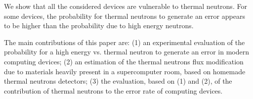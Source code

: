 We show that all the considered devices are vulnerable to thermal neutrons. For some devices, the probability for thermal neutrons to generate an error appears to be higher than the probability due to high energy neutrons.  

The main contributions of this paper are: (1) an experimental evaluation of the probability for a high energy vs. thermal neutron to generate an error in modern computing devices; (2) an estimation of the thermal neutrons flux modification due to materials heavily present in a supercomputer room, based on homemade thermal neutrons detectors; (3) the evaluation, based on (1) and (2), of the contribution of thermal neutrons to the error rate of computing devices. 



